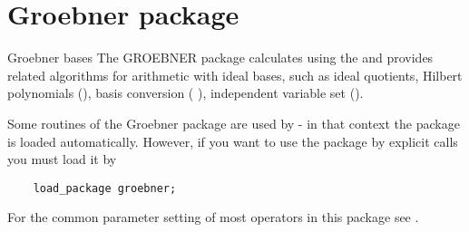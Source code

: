 \section{Groebner package}
\begin{Introduction}{Groebner bases}
The GROEBNER package calculates  using the
 and provides related algorithms
for arithmetic with ideal bases, such as ideal quotients,
Hilbert polynomials (), 
basis conversion (
), independent  
variable set ().



Some routines of the Groebner package are used by  - in
that context the package is loaded automatically. However, if you
want to use the package by explicit calls you must load it by
\begin{verbatim}
    load_package groebner;
\end{verbatim}

For the common parameter setting of most operators in this package 
see .
\end{Introduction}




